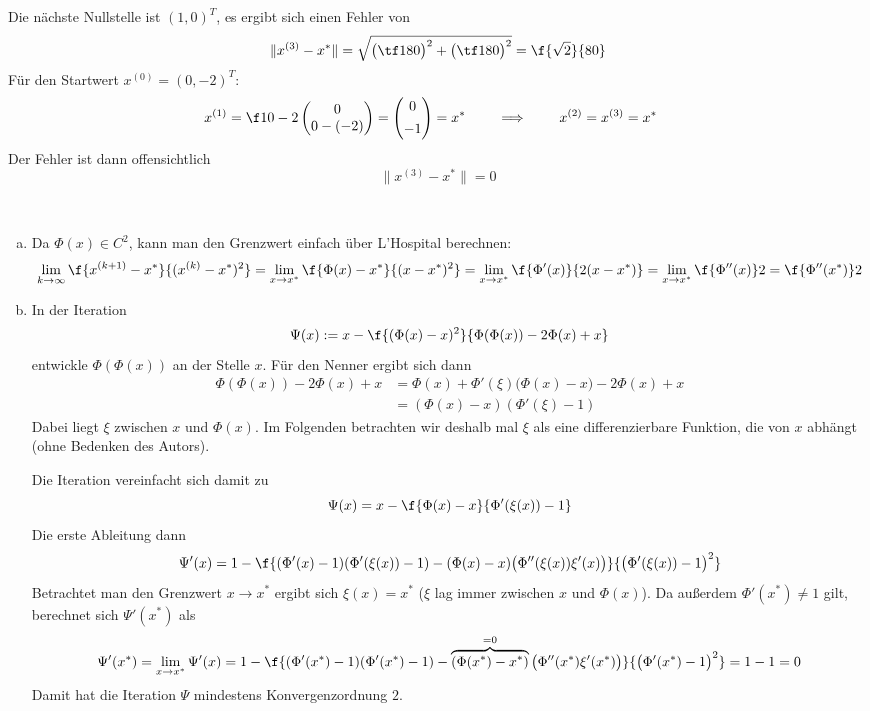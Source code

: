 \documentclass{mywork}
\begin{document}
\begin{aufgabe}
\begin{enumerate}[a)]
			Die nächste Nullstelle ist $(1,0)^T$, es ergibt sich einen Fehler von
			\[
				\|x^{(3)} - x^*\| = \sqrt{\big(\tf 1{80}\big)^2 + \big(\tf 1{80}\big)^2} = \f {\sqrt 2}{80}
			\]
			Für den Startwert $x^{(0)} = (0,-2)^T$:
			\begin{align*}
				x^{(1)} &= \f 1{0-2} \begin{pmatrix}
					0 \\ 0 - (-2)
				\end{pmatrix} = \begin{pmatrix}
					0 \\[0.4em]
					-1
				\end{pmatrix} = x^* \qquad \implies \qquad 
				x^{(2)} = x^{(3)} = x^*
			\end{align*}
			Der Fehler ist dann offensichtlich
			\[
				\|x^{(3)} -x^*\| = 0
			\]
	\end{enumerate}
\end{aufgabe}

\begin{aufgabe}~

	\begin{enumerate}[a)]
		\item
			Da $\Phi(x) \in C^2$, kann man den Grenzwert einfach über L'Hospital berechnen:  
			\begin{align*}
				\lim_{k\to \infty} \f {x^{(k+1)}-x^*}{(x^{(k)}-x^*)^2}
				= \lim_{x \to x^*} \f {\Phi(x) - x^*}{(x - x^*)^2} 
				= \lim_{x \to x^*} \f {\Phi'(x)}{2(x-x^*)}
				= \lim_{x \to x^*} \f {\Phi''(x)}2
				= \f {\Phi''(x^*)}2
			\end{align*}
		\item
			In der Iteration
			\[
				\Psi(x) := x - \f {(\Phi(x) - x)^2}{\Phi(\Phi(x)) - 2\Phi(x) + x}
			\]
			entwickle $\Phi(\Phi(x))$ an der Stelle $x$.
			Für den Nenner ergibt sich dann
			\begin{align*}
				\Phi(\Phi(x)) - 2 \Phi(x) + x
				&= \Phi(x) + \Phi'(\xi)\Big(\Phi(x)-x\Big) - 2 \Phi(x) + x \\
				&= (\Phi(x) - x)(\Phi'(\xi) - 1)
			\end{align*}
			Dabei liegt $\xi$ zwischen $x$ und $\Phi(x)$.
			Im Folgenden betrachten wir deshalb mal $\xi$ als eine differenzierbare Funktion, die von $x$ abhängt (ohne Bedenken des Autors).

			Die Iteration vereinfacht sich damit zu
			\[
				\Psi(x) = x - \f {\Phi(x) - x}{\Phi'(\xi(x)) - 1}
			\]
			Die erste Ableitung dann
			\[
				\Psi'(x) = 1 - \f{(\Phi'(x)-1)(\Phi'(\xi(x))-1) - (\Phi(x) - x)\big(\Phi''(\xi(x)) \xi'(x) \big)}{\big(\Phi'(\xi(x))-1\big)^2}
			\]
			Betrachtet man den Grenzwert $x \to x^*$ ergibt sich $\xi(x) = x^*$ ($\xi$ lag immer zwischen $x$ und $\Phi(x)$).
			Da außerdem $\Phi'(x^*) \neq 1$ gilt, berechnet sich $\Psi'(x^*)$ als
			\[
				\Psi'(x^*) = \lim_{x\to x^*}\Psi'(x) = 1 - \f{(\Phi'(x^*)-1)(\Phi'(x^*)-1) - \overbrace{(\Phi(x^*) - x^*)}^{=0}\big(\Phi''(x^*) \xi'(x^*) \big)}{\big(\Phi'(x^*)-1\big)^2}
				= 1 - 1 = 0
			\]
			Damit hat die Iteration $\Psi$ mindestens Konvergenzordnung $2$.
	\end{enumerate}

\end{aufgabe}
\end{document}
